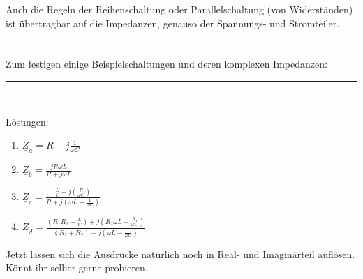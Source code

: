 \documentclass{article}
\begin{document}
\begin{mdframed}
Auch die Regeln der Reihenschaltung oder Parallelschaltung (von Widerständen) ist übertragbar auf die Impedanzen, genauso der Spannungs- und Stromteiler.\\ \\ \\
Zum festigen einige Beispielschaltungen und deren komplexen Impedanzen:
\justify
\centering
\raisebox{-0.2\height}{}
\raisebox{-0.2\height}{}
\raisebox{-0.2\height}{}
\raisebox{-0.2\height}{}\\
\vspace{1.5\baselineskip}
\rule{0.3\textwidth}{0.5pt}\\
\justify
\begin{minipage}{0.4\textwidth}
Lösungen:
\begin{enumerate}[label=(\alph*)]
\item $\displaystyle \underline{Z}_a = R-j\frac{1}{\omega C}$
\item $\displaystyle \underline{Z}_b = \frac{jR\omega L}{R + j\omega L}$
\item $\displaystyle \underline{Z}_c = \frac{\frac{L}{C}-j(\frac{R}{\omega C})}{R + j(\omega L - \frac{1}{\omega C})}$
\item $\displaystyle \underline{Z}_d = \frac{(R_1R_2 + \frac{L}{C}) + j(R_2 \omega L - \frac{R_1}{\omega C})}{(R_1 + R_2) + j(\omega L - \frac{1}{\omega C})}$
\end{enumerate}
\end{minipage}
\begin{minipage}{0.4\textwidth}
Jetzt lassen sich die Ausdrücke natürlich noch in Real- und Imaginärteil auflösen. Könnt ihr selber gerne probieren.
\end{minipage}\\
\par\vspace{0.5\baselineskip}
\centering
\end{mdframed}

\flushleft
\end{document}
